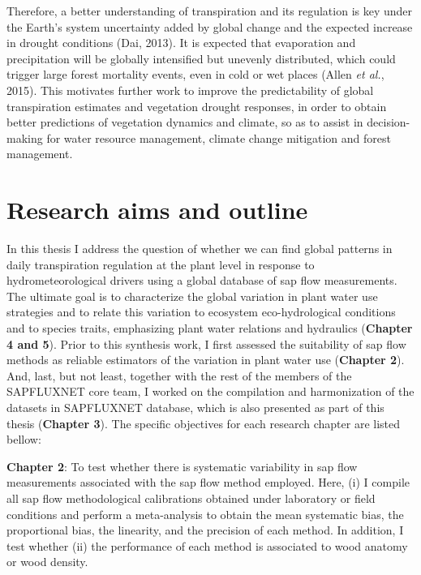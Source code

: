 \documentclass[11pt,twoside]{reedthesis}
\begin{document}
Therefore, a better understanding of transpiration and its regulation is
key under the Earth's system uncertainty added by global change and the
expected increase in drought conditions (Dai, 2013). It is expected that
evaporation and precipitation will be globally intensified but unevenly
distributed, which could trigger large forest mortality events, even in
cold or wet places (Allen \emph{et al.}, 2015). This motivates further
work to improve the predictability of global transpiration estimates and
vegetation drought responses, in order to obtain better predictions of
vegetation dynamics and climate, so as to assist in decision-making for
water resource management, climate change mitigation and forest
management.\par

\section{Research aims and outline}\label{research-aims-and-outline}

In this thesis I address the question of whether we can find global
patterns in daily transpiration regulation at the plant level in
response to hydrometeorological drivers using a global database of sap
flow measurements. The ultimate goal is to characterize the global
variation in plant water use strategies and to relate this variation to
ecosystem eco-hydrological conditions and to species traits, emphasizing
plant water relations and hydraulics (\textbf{Chapter 4 and 5}). Prior
to this synthesis work, I first assessed the suitability of sap flow
methods as reliable estimators of the variation in plant water use
(\textbf{Chapter 2}). And, last, but not least, together with the rest
of the members of the SAPFLUXNET core team, I worked on the compilation
and harmonization of the datasets in SAPFLUXNET database, which is also
presented as part of this thesis (\textbf{Chapter 3}). The specific
objectives for each research chapter are listed bellow:\par

\textbf{Chapter 2}: To test whether there is systematic variability in
sap flow measurements associated with the sap flow method employed.
Here, (i) I compile all sap flow methodological calibrations obtained
under laboratory or field conditions and perform a meta-analysis to
obtain the mean systematic bias, the proportional bias, the linearity,
and the precision of each method. In addition, I test whether (ii) the
performance of each method is associated to wood anatomy or wood
density.\par
\end{document}
